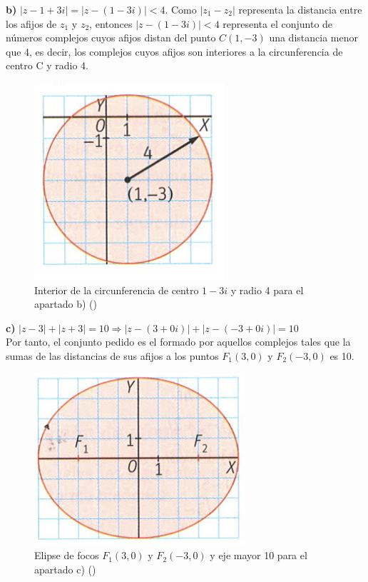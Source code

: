 \documentclass[../main.tex]{memoir}
\begin{document}
\textbf{b)} $|z-1+3i| = |z- (1-3i)| <4$. Como $|z_1-z_2|$ representa la distancia entre los afijos de $z_1$ y $z_2$, entonces $|z- (1-3i)| <4$ representa el conjunto de números complejos cuyos afijos distan del punto $C(1,-3)$ una distancia menor que 4, es decir, los complejos cuyos afijos son interiores a la circunferencia de centro C y radio 4.

\begin{figure}[H]
	\centering
	\includegraphics[scale=0.4]{images/region2.png}
	\caption{Interior de la circunferencia de centro $1-3i$ y radio 4 para el apartado b) (\cite{sm1bach})}
	\label{region2}
\end{figure}

\textbf{c)} $|z-3|+ |z+3| = 10 \Rightarrow |z - (3+0i)| + |z - (-3+0i)| = 10$ \\
Por tanto, el conjunto pedido es el formado por aquellos complejos tales que la sumas de las distancias de sus afijos a los puntos $F_1(3,0)$ y $F_2(-3,0)$ es 10.

\begin{figure}[H]
	\centering
	\includegraphics[scale=0.4]{images/region3.png}
	\caption{Elipse de focos $F_1(3,0)$ y $F_2(-3,0)$ y eje mayor 10 para el apartado c) (\cite{sm1bach})}
	\label{region3}
\end{figure}
\end{document}
